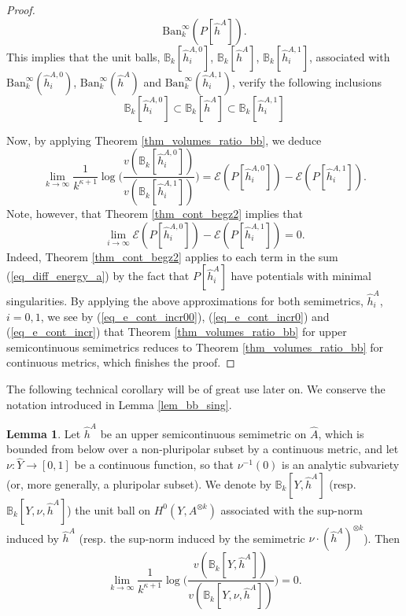 \documentclass[12pt]{article}
\numberwithin{equation}{section}
\theoremstyle{theorem}
\theoremstyle{definition}
\newtheorem{lem}[thm]{Lemma}
\theoremstyle{remark}
\newcommand{\vol}{v}
\begin{document}
\begin{proof}
\begin{equation}
			{\textrm{Ban}}_k^{\infty}(P[\widehat{h}^A]).
		\end{equation}
		This implies that the unit balls, $\mathbb{B}_k[\widehat{h}^{A, 0}_i]$, $\mathbb{B}_k[\widehat{h}^{A}]$, $\mathbb{B}_k[\widehat{h}^{A, 1}_i]$, associated with ${\textrm{Ban}}_k^{\infty}(\widehat{h}^{A, 0}_i)$, ${\textrm{Ban}}_k^{\infty}(\widehat{h}^A)$ and ${\textrm{Ban}}_k^{\infty}(\widehat{h}^{A, 1}_i)$, verify the following inclusions
		\begin{equation}\label{eq_e_cont_incr00}
			\mathbb{B}_k[\widehat{h}^{A, 0}_i] \subset \mathbb{B}_k[\widehat{h}^{A}] \subset \mathbb{B}_k[\widehat{h}^{A, 1}_i]
		\end{equation}
		\par
		Now, by applying Theorem \ref{thm_volumes_ratio_bb}, we deduce
		\begin{equation}\label{eq_e_cont_incr0}
			\lim_{k \to \infty}
			\frac{1}{k^{\kappa + 1}} \log \Big( \frac{\vol(\mathbb{B}_k[\widehat{h}^{A, 0}_i])}{\vol(\mathbb{B}_k[\widehat{h}^{A, 1}_i])}
			\Big)
			=
			\mathscr{E}(P[\widehat{h}^{A, 0}_i]) - \mathscr{E}(P[\widehat{h}^{A, 1}_i]).
		\end{equation}
		Note, however, that Theorem \ref{thm_cont_begz2} implies that
		\begin{equation}\label{eq_e_cont_incr}
			\lim_{i \to \infty}
			\mathscr{E}(P[\widehat{h}^{A, 0}_i]) - \mathscr{E}(P[\widehat{h}^{A, 1}_i])
			=
			0.
		\end{equation}
		Indeed, Theorem \ref{thm_cont_begz2} applies to each term in the sum (\ref{eq_diff_energy_a}) by the fact that $P[\widehat{h}^A_i]$ have potentials with minimal singularities. 
		By applying the above approximations for both semimetrics, $\widehat{h}^A_i$, $i = 0, 1$, we see by (\ref{eq_e_cont_incr00}), (\ref{eq_e_cont_incr0}) and (\ref{eq_e_cont_incr}) that Theorem \ref{thm_volumes_ratio_bb} for upper semicontinuous semimetrics reduces to Theorem \ref{thm_volumes_ratio_bb} for continuous metrics, which finishes the proof.
	\end{proof}
	The following technical corollary will be of great use later on.
	We conserve the notation introduced in Lemma \ref{lem_bb_sing}.
	\begin{lem}\label{lem_twist_rho}
		Let $\widehat{h}^A$ be an upper semicontinuous semimetric on $\widehat{A}$, which is bounded from below over a non-pluripolar subset by a continuous metric, and let $\nu : \widehat{Y} \to [0, 1]$ be a continuous function, so that $\nu^{-1}(0)$ is an analytic subvariety (or, more generally, a pluripolar subset).
		We denote by $\mathbb{B}_k[Y, \widehat{h}^A]$ (resp. $\mathbb{B}_k[Y, \nu, \widehat{h}^A]$) the unit ball on $H^0(Y, A^{\otimes k})$ associated with the sup-norm induced by $\widehat{h}^A$ (resp. the sup-norm induced by the semimetric $\nu \cdot (\widehat{h}^A)^{\otimes k}$).
		Then
		\begin{equation}\label{eq_twist_rho}
			\lim_{k \to \infty}
			\frac{1}{k^{\kappa + 1}}
			\log\Big(
			\frac{\vol(\mathbb{B}_k[Y, \widehat{h}^A])}{\vol(\mathbb{B}_k[Y, \nu, \widehat{h}^A])}
			\Big)
			=
			0.
		\end{equation}
	\end{lem}
\end{document}
